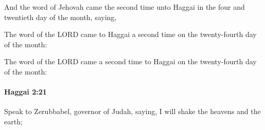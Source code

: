 			\begin{versebox}
					\item[BHS] 
					\item[LXX] 
					\item[ASV] And the word of Jehovah came the second time unto Haggai in the four and twentieth day of the month, saying,
					\item[NIV] The word of the LORD came to Haggai a second time on the twenty-fourth day of the month:
					\item[NRSV] The word of the LORD came a second time to Haggai on the twenty-fourth day of the month:
			\end{versebox}

		\paragraph{Haggai 2:21} %
			\label{HAGGAI-2-21}

			Speak to Zerubbabel, governor of Judah, saying, I will shake the heavens and the earth;

